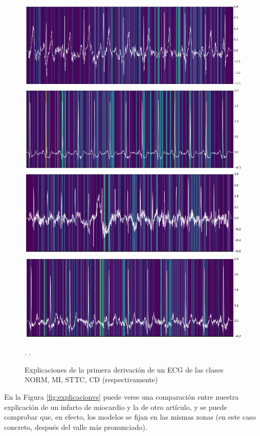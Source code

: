 \begin{figure}
	\centering
	\includegraphics[width=0.9\linewidth]{Imagenes/Vectorial/explanations/NORM.png}
	\includegraphics[width=0.9\linewidth]{Imagenes/Vectorial/explanations/MI.png}
	\includegraphics[width=0.9\linewidth]{Imagenes/Vectorial/explanations/STTC.png}
	\includegraphics[width=0.9\linewidth]{Imagenes/Vectorial/explanations/CD.png}
	\caption{Explicaciones de la primera derivación de un ECG de las clases NORM, MI, STTC, CD (respectivamente)}.
	\label{fig:explicaciones}.
\end{figure}

En la Figura \ref{fig:explicacionvs} puede verse una comparación entre nuestra explicación de un infarto de miocardio y la de otro artículo, y se puede comprobar que, en efecto, los modelos se fijan en las mismas zonas (en este caso concreto, después del valle más pronunciado).

